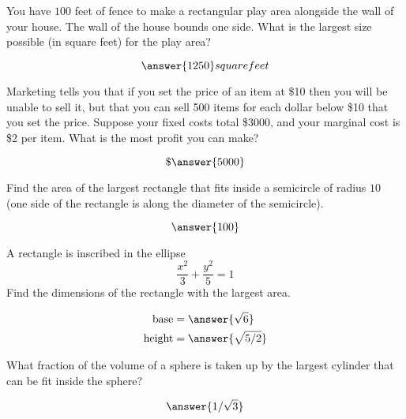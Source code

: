 \documentclass[handout]{ximera}
\begin{document}
\begin{exercise}
You have $100$ feet of fence to make a rectangular play area
  alongside the wall of your house.  The wall of the house bounds one
  side.  What is the largest size possible (in square feet) for the
  play area?
  \begin{prompt}
  \[
  \answer{1250} square feet
  \]
  \end{prompt}
\end{exercise}


\begin{exercise}
Marketing tells you that if you set the price of an item at \$10
  then you will be unable to sell it, but that you can sell 500 items
  for each dollar below \$10 that you set the price.  Suppose your
  fixed costs total \$3000, and your marginal cost is \$2 per item.
  What is the most profit you can make?
  \begin{prompt}
  \[
  \$ \answer{5000}
  \]
  \end{prompt}
\end{exercise}

\begin{exercise}
Find the area of the largest rectangle that fits inside a semicircle
  of radius $10$ (one side of the rectangle is along the diameter of
  the semicircle).
  \begin{prompt}
  \[
  \answer{100}
  \]
  \end{prompt}
\end{exercise}

\begin{exercise}
A rectangle is inscribed in the ellipse
  \[
  \frac{x^2}{3}+\frac{y^2}{5}=1
  \]
  Find the dimensions of the rectangle with the largest area.
  \begin{prompt}
  \begin{align*}
  \text{base} &= \answer{\sqrt{6}}\\
  \text{height} &= \answer{\sqrt{5/2}}
  \end{align*}
  \end{prompt}
\end{exercise}

\begin{exercise}
What fraction of the volume of a sphere is taken up by the largest cylinder
  that can be fit inside the sphere?
  \begin{prompt}
  \[
  \answer{1/\sqrt{3}}
  \]
  \end{prompt}
\end{exercise}
\end{document}
